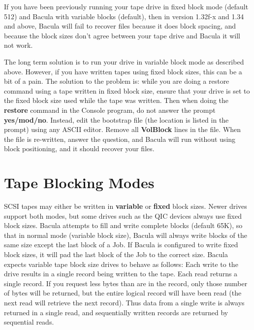If you have been previously running your tape drive in fixed block mode
(default 512) and Bacula with variable blocks (default), then in version
1.32f-x and 1.34 and above, Bacula will fail to recover files because it does
block spacing, and because the block sizes don't agree between your tape drive
and Bacula it will not work. 

The long term solution is to run your drive in variable block mode as
described above. However, if you have written tapes using fixed block sizes,
this can be a bit of a pain. The solution to the problem is: while you are
doing a restore command using a tape written in fixed block size, ensure that
your drive is set to the fixed block size used while the tape was written.
Then when doing the {\bf restore} command in the Console program, do not
answer the prompt {\bf yes/mod/no}. Instead, edit the bootstrap file (the
location is listed in the prompt) using any ASCII editor. Remove all {\bf
VolBlock} lines in the file. When the file is re-written, answer the question,
and Bacula will run without using block positioning, and it should recover
your files. 

\label{BlockModes}
\section{Tape Blocking Modes}

SCSI tapes may either be written in {\bf variable} or {\bf fixed} block sizes.
Newer drives support both modes, but some drives such as the QIC devices
always use fixed block sizes. Bacula attempts to fill and write complete
blocks (default 65K), so that in normal mode (variable block size), Bacula
will always write blocks of the same size except the last block of a Job. If
Bacula is configured to write fixed block sizes, it will pad the last block of
the Job to the correct size. Bacula expects variable tape block size drives to
behave as follows: Each write to the drive results in a single record being
written to the tape. Each read returns a single record. If you request less
bytes than are in the record, only those number of bytes will be returned, but
the entire logical record will have been read (the next read will retrieve the
next record). Thus data from a single write is always returned in a single
read, and sequentially written records are returned by sequential reads. 

